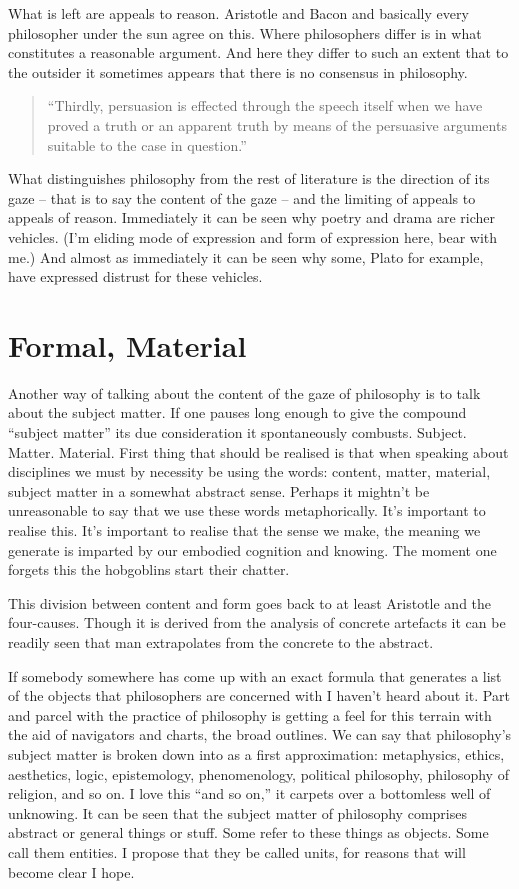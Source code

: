 \documentclass[dah,phd,a4paper]{xe_uccthesis}
\begin{document}
What is left are appeals to reason. Aristotle and Bacon and basically every philosopher under the sun agree on this. Where philosophers differ is in what constitutes a reasonable argument. And here they differ to such an extent that to the outsider it sometimes appears that there is no consensus in philosophy.

\begin{quotation}
“Thirdly, persuasion is effected through the speech itself when we have proved a truth or an apparent truth by means of the persuasive arguments suitable to the case in question.”
\end{quotation}

What distinguishes philosophy from the rest of literature is the direction of its gaze – that is to say the content of the gaze – and the limiting of appeals to appeals of reason. Immediately it can be seen why poetry and drama are richer vehicles. (I'm eliding mode of expression and form of expression here, bear with me.) And almost as immediately it can be seen why some, Plato for example, have expressed distrust for these vehicles.

\section{Formal, Material}

Another way of talking about the content of the gaze of philosophy is to talk about the subject matter. If one pauses long enough to give the compound “subject matter” its due consideration it spontaneously combusts. Subject. Matter. Material. First thing that should be realised is that when speaking about disciplines we must by necessity be using the words: content, matter, material, subject matter in a somewhat abstract sense. Perhaps it mightn't be unreasonable to say that we use these words metaphorically. It's important to realise this. It's important to realise that the sense we make, the meaning we generate is imparted by our embodied cognition and knowing. The moment one forgets this the hobgoblins start their chatter.

This division between content and form goes back to at least Aristotle and the four-causes. Though it is derived from the analysis of concrete artefacts it can be readily seen that man extrapolates from the concrete to the abstract.

If somebody somewhere has come up with an exact formula that generates a list of the objects that philosophers are concerned with I haven't heard about it. Part and parcel with the practice of philosophy is getting a feel for this terrain with the aid of navigators and charts, the broad outlines. We can say that philosophy's subject matter is broken down into as a first approximation: metaphysics, ethics, aesthetics, logic, epistemology, phenomenology, political philosophy, philosophy of religion, and so on. I love this “and so on,” it carpets over a bottomless well of unknowing. It can be seen that the subject matter of philosophy comprises abstract or general things or stuff. Some refer to these things as objects. Some call them entities. I propose that they be called units, for reasons that will become clear I hope.
\end{document}
